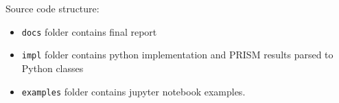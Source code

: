 \documentclass[12pt]{article}
\theoremstyle{definition}
\begin{document}
\appendix
Source code structure:
\begin{itemize}
\item \texttt{docs} folder contains final report
\item \texttt{impl} folder contains python implementation and PRISM results
  parsed to Python classes
\item \texttt{examples} folder contains jupyter notebook examples.
\end{itemize}

\printbibliography
\end{document}

